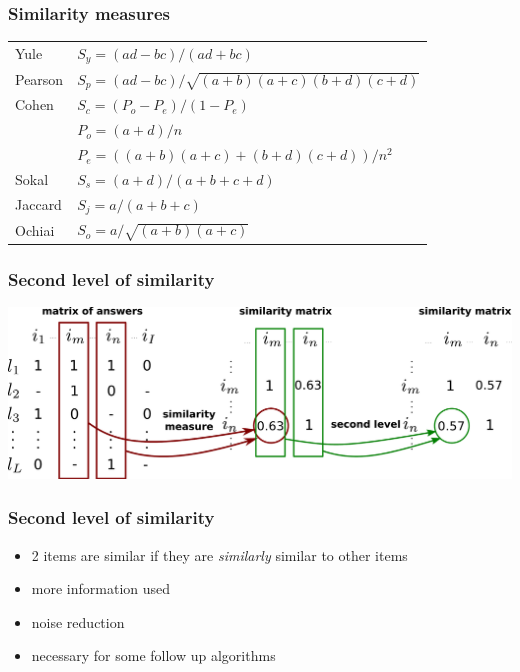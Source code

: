 \documentclass[xcolor=svgnames]{beamer}
\begin{document}
\begin{frame}
    \frametitle{Similarity measures}

    \begin{center}
        \begin{tabular}{ll}
             Yule & $S_y = (ad-bc) / (ad+bc)$ \\[2mm]
             Pearson  &   $S_p = (ad - bc) /
             \sqrt{(a+b)(a+c)(b+d)(c+d)}$ \\[2mm]
             Cohen &   $S_c = (P_o - P_e) / (1 - P_e)$ \\
             & $ P_o = (a + d) / n$ \\
             & $P_e = ((a+b)(a+c) + (b+d)(c+d)) / n^2$\\[2mm]
             Sokal & $S_s = (a+d) / (a+b+c+d)$ \\[2mm] %
             Jaccard & $S_j = a / (a+b+c)$ \\[2mm]
             Ochiai &  $S_o = a / \sqrt{(a+b)(a+c)}$ \\
        \end{tabular}
    \end{center}
\end{frame}
\begin{frame}
    \frametitle{Second level of similarity}
    \centering
    \includegraphics[width=\linewidth]{figures/diagram-second-step}
\end{frame}
\begin{frame}
    \frametitle{Second level of similarity}
    \Large
    \begin{itemize}
        \item 2 items are similar if they are \emph{similarly} similar to other items
        \item more information used
        \item noise reduction
        \item necessary for some follow up algorithms
    \end{itemize}
\end{frame}
\end{document}
